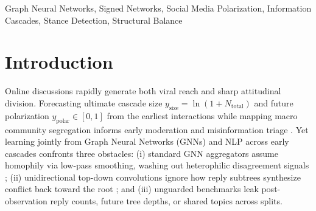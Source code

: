 \documentclass[conference]{IEEEtran}
\begin{document}
\begin{abstract}
verification of AI-pre-annotated VN pairs ($120$ Test pairs, $30$ trees) and RumourEval-2019 SDQC ($1{,}675$ pairs) further reveals weak silver-label alignment (VN weighted stance accuracy $24.79\%$, $30$-tree $\rho = 0.0018$; RumourEval $2.0\%$--$3.8\%$ minority recall) and \emph{Target-Misattributed Profanity} ($4/7 = 57.1\%$ third-party-cursing supporting replies flipped to opposition). Conversely, lifting the same 2D attributes onto macro user networks exposes sharp spectral separation (VN $Q_{\text{signed}} = 0.4280$, $+19.1$~pp cross-camp opposition, anti-balanced $z = -15.17$; PHEME $Q_{\text{signed}} = 0.8232$ on a sparse $212$-triangle WCC, $+54.5$~pp, RWC $= 0.6218$, $z = -4.30$), where \texttt{SBiFAGAT-Link} shows directional transductive gains on PHEME (\texttt{ROC-AUC} $= 0.9181$, \texttt{PR-AUC} $= 0.7616$, \texttt{Macro-F1} $= 0.8006$; unadjusted paired-$t$ $p = 0.0270$, Exact Perm.\ $p = 0.0625$, $p_{\text{adj}} = 0.1622/0.3750$; $21.7\%$ recurring pairs).
\end{abstract}

\begin{IEEEkeywords}
Graph Neural Networks, Signed Networks, Social Media Polarization, Information Cascades, Stance Detection, Structural Balance
\end{IEEEkeywords}

\section{Introduction}
Online discussions rapidly generate both viral reach and sharp attitudinal division. Forecasting ultimate cascade size $y_{\text{size}} = \ln(1 + N_{\text{total}})$ and future polarization $y_{\text{polar}} \in [0, 1]$ from the earliest interactions while mapping macro community segregation informs early moderation and misinformation triage \cite{zubiaga2016analysing,li2017deepcas,garimella2018quantifying}. Yet learning jointly from Graph Neural Networks (GNNs) and NLP across early cascades confronts three obstacles: (i) standard GNN aggregators assume homophily via low-pass smoothing, washing out heterophilic disagreement signals \cite{bo2021beyond,platonov2023critical}; (ii) unidirectional top-down convolutions ignore how reply subtrees synthesize conflict back toward the root \cite{bian2020rumor}; and (iii) unguarded benchmarks leak post-observation reply counts, future tree depths, or shared topics across splits.
\end{document}
